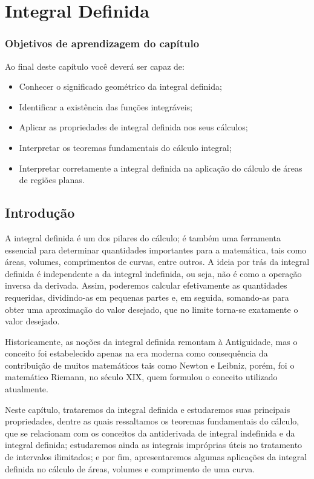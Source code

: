\cleardoublepage\documentclass[../main.tex]{subfiles}
\begin{document}
\chapter{Integral Definida}\label{cap:IntDef}
\minitoc
\subsection*{Objetivos de aprendizagem do capítulo}
Ao final deste capítulo você deverá ser capaz de:
\begin{itemize}
    \item Conhecer o significado geométrico da integral definida;
    \item Identificar a existência das funções integráveis;
    \item Aplicar as propriedades de integral definida nos seus cálculos;
    \item Interpretar os teoremas fundamentais do cálculo integral;
    \item Interpretar corretamente a integral definida na aplicação do cálculo de áreas de regiões planas.
\end{itemize}

\section{Introdução}
A integral definida é um dos pilares do cálculo; é também uma ferramenta essencial para determinar quantidades importantes para a matemática, tais como áreas, volumes, comprimentos de curvas, entre outros. A ideia por trás da integral definida é independente a da integral indefinida, ou seja, não é como a operação inversa da derivada. Assim, poderemos calcular efetivamente as quantidades requeridas, dividindo-as em pequenas partes e, em seguida, somando-as para obter uma aproximação do valor desejado, que no limite torna-se exatamente o valor desejado.

Historicamente, as noções da integral definida remontam à Antiguidade, mas o conceito foi estabelecido apenas na era moderna como consequência da contribuição de muitos matemáticos tais como Newton e Leibniz, porém, foi o matemático Riemann, no século XIX, quem formulou o conceito utilizado atualmente.

Neste capítulo, trataremos da integral definida e estudaremos suas principais propriedades, dentre as quais ressaltamos os teoremas fundamentais do cálculo, que se relacionam com os conceitos da antiderivada de integral indefinida e da integral definida; estudaremos ainda as integrais impróprias úteis no tratamento de intervalos ilimitados; e por fim, apresentaremos algumas aplicações da integral definida no cálculo de áreas, volumes e comprimento de uma curva.
\end{document}
